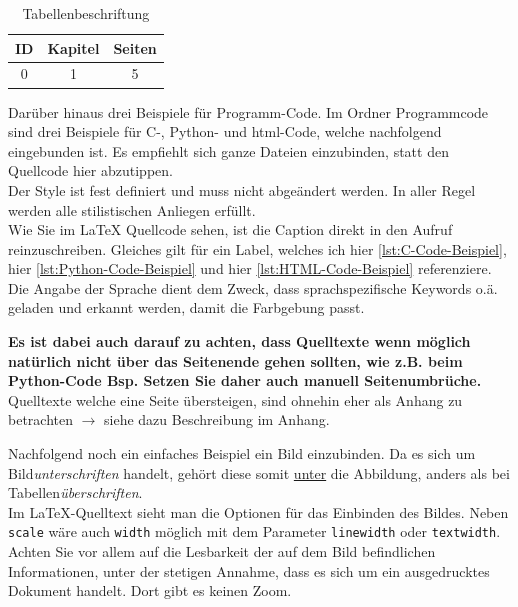 \begin{table}[!h]
    \caption[Tabellenbeschriftung]{Tabellenbeschriftung \cite{Tane2014}}
    \centering
    \begin{tabular}{|c|c|c|}
        \hline
        ID & Kapitel & Seiten \\\hline
        0 & 1 & 5 \\\hline
    \end{tabular}
    \label{tab:Beispieltabelle}
\end{table}

Darüber hinaus drei Beispiele für Programm-Code. Im Ordner \glqq Programmcode\grqq{} sind drei Beispiele für C-, Python- und \ac{html}-Code, welche nachfolgend eingebunden ist.
Es empfiehlt sich ganze Dateien einzubinden, statt den Quellcode hier abzutippen.\\
Der Style ist fest definiert und muss nicht abgeändert werden. In aller Regel werden alle stilistischen Anliegen erfüllt.\\
Wie Sie im \LaTeX{} Quellcode sehen, ist die Caption direkt in den Aufruf reinzuschreiben. Gleiches gilt für ein Label, welches ich hier \ref{lst:C-Code-Beispiel}, hier \ref{lst:Python-Code-Beispiel} und hier \ref{lst:HTML-Code-Beispiel} referenziere.\\
Die Angabe der Sprache dient dem Zweck, dass sprachspezifische Keywords o.ä. geladen und erkannt werden, damit die Farbgebung passt.




\textbf{Es ist dabei auch darauf zu achten, dass Quelltexte wenn möglich natürlich nicht über das Seitenende gehen sollten, wie z.B. beim Python-Code Bsp. Setzen Sie daher auch manuell
Seitenumbrüche.} Quelltexte welche eine Seite übersteigen, sind ohnehin eher als Anhang zu betrachten $\rightarrow$ siehe dazu Beschreibung im Anhang.



Nachfolgend noch ein einfaches Beispiel ein Bild einzubinden. Da es sich um Bild\textit{unterschriften} handelt, gehört diese somit \underline{unter} die Abbildung, anders als bei Tabellen\textit{überschriften}.\\
Im \LaTeX-Quelltext sieht man die Optionen für das Einbinden des Bildes. Neben \texttt{scale} wäre auch \texttt{width} möglich mit dem Parameter \texttt{linewidth} oder \texttt{textwidth}.\\
Achten Sie vor allem auf die Lesbarkeit der auf dem Bild befindlichen Informationen, unter der stetigen Annahme, dass es sich um ein ausgedrucktes Dokument handelt. Dort gibt es keinen Zoom.

